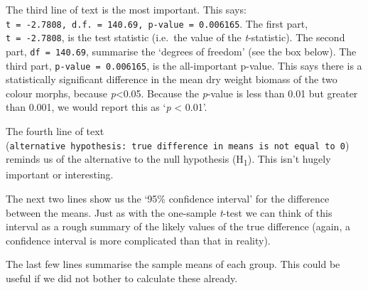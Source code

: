 \documentclass[
]{book}
\begin{document}
The third line of text is the most important. This says: \texttt{t\ =\ -2.7808,\ d.f.\ =\ 140.69,\ p-value\ =\ 0.006165}. The first part, \texttt{t\ =\ -2.7808}, is the test statistic (i.e.~the value of the \emph{t}-statistic). The second part, \texttt{df\ =\ 140.69}, summarise the `degrees of freedom' (see the box below). The third part, \texttt{p-value\ =\ 0.006165}, is the all-important p-value. This says there is a statistically significant difference in the mean dry weight biomass of the two colour morphs, because \emph{p}\textless0.05. Because the \emph{p}-value is less than 0.01 but greater than 0.001, we would report this as `\emph{p} \textless{} 0.01'.

The fourth line of text (\texttt{alternative\ hypothesis:\ true\ difference\ in\ means\ is\ not\ equal\ to\ 0}) reminds us of the alternative to the null hypothesis (H\textsubscript{1}). This isn't hugely important or interesting.

The next two lines show us the `95\% confidence interval' for the difference between the means. Just as with the one-sample \emph{t}-test we can think of this interval as a rough summary of the likely values of the true difference (again, a confidence interval is more complicated than that in reality).

The last few lines summarise the sample means of each group. This could be useful if we did not bother to calculate these already.
\end{document}
